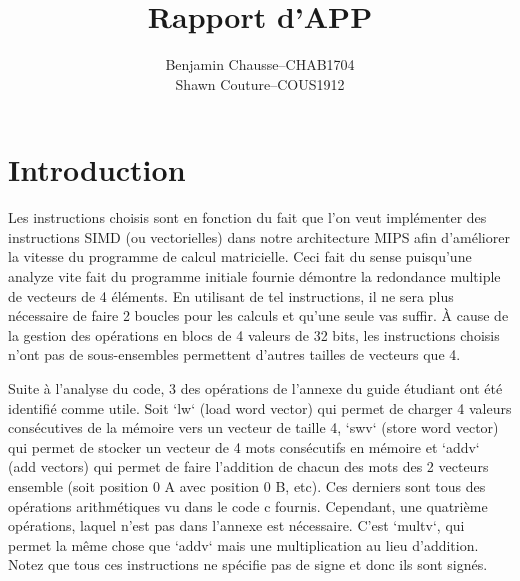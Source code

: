 \documentclass[a11paper]{article}
\title{Rapport d'APP}
\author{
  \addtolength{\tabcolsep}{-0.4em}
  \begin{tabular}{rcl} %
      Benjamin Chausse & -- & CHAB1704 \\
      Shawn Couture    & -- & COUS1912 \\
  \end{tabular}
}
\begin{document}
\maketitle
\newpage

\section{Introduction}
Les instructions choisis sont en fonction du fait que l'on veut implémenter des instructions SIMD (ou vectorielles) dans notre architecture MIPS afin d'améliorer
la vitesse du programme de calcul matricielle. Ceci fait du sense puisqu'une analyze vite fait du programme initiale fournie démontre la redondance multiple de vecteurs de 4 éléments.
En utilisant de tel instructions, il ne sera plus nécessaire de faire 2 boucles pour les calculs et qu'une seule vas suffir. À cause de la gestion des opérations en blocs de 4 valeurs de 32 bits, les instructions choisis n'ont pas de sous-ensembles permettent d'autres tailles de vecteurs que 4.

Suite à l'analyse du code, 3 des opérations de l'annexe du guide étudiant ont été identifié comme utile. Soit `lw` (load word vector) qui permet de charger 4 valeurs consécutives de la mémoire vers un vecteur de taille 4, `swv` (store word vector) qui permet de stocker un vecteur de 4 mots consécutifs en mémoire et `addv` (add vectors) qui permet de faire l'addition de chacun des mots des 2 vecteurs ensemble (soit position 0 A avec position 0 B, etc). Ces derniers sont tous des opérations arithmétiques vu dans le code c fournis. Cependant, une quatrième opérations, laquel n'est pas dans l'annexe est nécessaire. C'est `multv`, qui permet la même chose que `addv` mais une multiplication au lieu d'addition. Notez que tous ces instructions ne spécifie pas de signe et donc ils sont signés.
\end{document}
